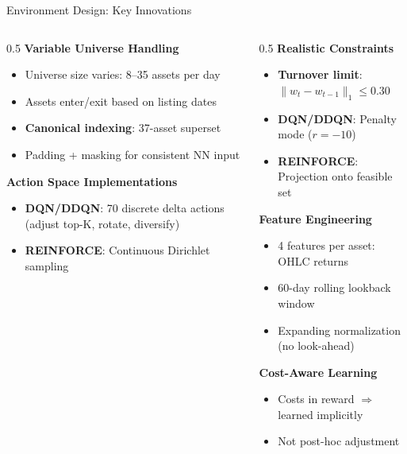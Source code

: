 \documentclass[aspectratio=169]{beamer}
\begin{document}
\begin{frame}{Environment Design: Key Innovations}
\footnotesize

\begin{columns}[T,totalwidth=\textwidth]
\begin{column}{0.5\textwidth}
\textbf{Variable Universe Handling}
\begin{itemize}\setlength{\itemsep}{2pt}
  \item Universe size varies: 8--35 assets per day
  \item Assets enter/exit based on listing dates
  \item \textbf{Canonical indexing}: 37-asset superset
  \item Padding + masking for consistent NN input
\end{itemize}

\vspace{0.3em}
\textbf{Action Space Implementations}
\begin{itemize}\setlength{\itemsep}{2pt}
  \item \textbf{DQN/DDQN}: 70 discrete delta actions (adjust top-K, rotate, diversify)
  \item \textbf{REINFORCE}: Continuous Dirichlet sampling
\end{itemize}
\end{column}

\begin{column}{0.5\textwidth}
\textbf{Realistic Constraints}
\begin{itemize}\setlength{\itemsep}{2pt}
  \item \textbf{Turnover limit}: $\|w_t - w_{t-1}\|_1 \leq 0.30$
  \item \textbf{DQN/DDQN}: Penalty mode ($r = -10$)
  \item \textbf{REINFORCE}: Projection onto feasible set
\end{itemize}

\vspace{0.3em}
\textbf{Feature Engineering}
\begin{itemize}\setlength{\itemsep}{2pt}
  \item 4 features per asset: OHLC returns
  \item 60-day rolling lookback window
  \item Expanding normalization (no look-ahead)
\end{itemize}

\vspace{0.3em}
\textbf{Cost-Aware Learning}
\begin{itemize}\setlength{\itemsep}{2pt}
  \item Costs in reward $\Rightarrow$ learned implicitly
  \item Not post-hoc adjustment
\end{itemize}
\end{column}
\end{columns}

\end{frame}
\end{document}
